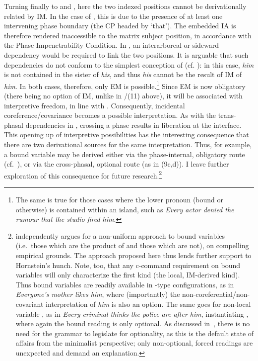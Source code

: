 \documentclass[output=paper]{langsci/langscibook}
\begin{document}
Turning finally to  and , here the two indexed
positions cannot be derivationally related by \gls{IM}. In the case of
, this is due to the presence of at least one intervening phase
boundary (the CP headed by \enquote*{that}). The embedded \gls{IA} is therefore rendered
inaccessible to the matrix subject position, in accordance with the Phase
Impenetrability Condition. In , an interarboreal or sideward
dependency would be required to link the two positions. It is arguable that
such dependencies do not conform to the simplest conception of  (cf.
\citealt{Chomsky2007}): in this case, \emph{him} is not contained in the sister
of \emph{his}, and thus \emph{his} cannot be the result of \gls{IM} of
\emph{him}. In both cases, therefore, only \gls{EM} is possible.\footnote{The
    same is true for those cases where the lower pronoun (bound or otherwise)
    is contained within an island, such as \emph{Every actor
    denied the rumour that the studio fired him}.} Since
    \gls{EM} is now obligatory (there being no option of \gls{IM}, unlike in
    /(11) above), it will be associated with interpretive
    freedom, in line with .  Consequently, incidental
    coreference/covariance becomes a possible interpretation. As with the
    trans-phasal dependencies in , crossing a phase results in
    liberation at the interface. This opening up of interpretive possibilities
    has the interesting consequence that there are two derivational sources for
    the same interpretation. Thus, for example, a bound variable may be derived
    either via the phase-internal, obligatory route (cf.\ ), or
    via the cross-phasal, optional route (as in (9c,d)). I leave further
    exploration of this consequence for future
    research.\footnote{\citet{Hornstein2013} independently argues for a
        non-uniform approach to bound variables (i.e.\ those which are the
        product of  and those which are not), on compelling empirical
        grounds. The approach proposed here thus lends further support to
        Hornstein’s hunch. Note, too, that any c-command requirement on bound
        variables will only characterize the first kind (the local, IM-derived
        kind). Thus bound variables are readily available in
        -type configurations, as in \emph{Everyone’s
        mother likes him}, where (importantly) the
        non-coreferential/non-covariant interpretation of \emph{him} is also an
        option. The same goes for non-local variable , as in \emph{Every
        criminal thinks the police are after him},
        instantiating , where again the bound reading is only
        optional.  As discussed in~, there is no need for
    the grammar to legislate for optionality, as this is the default state of
affairs from the minimalist perspective; only non-optional, forced readings are
unexpected and demand an explanation.}
\end{document}
